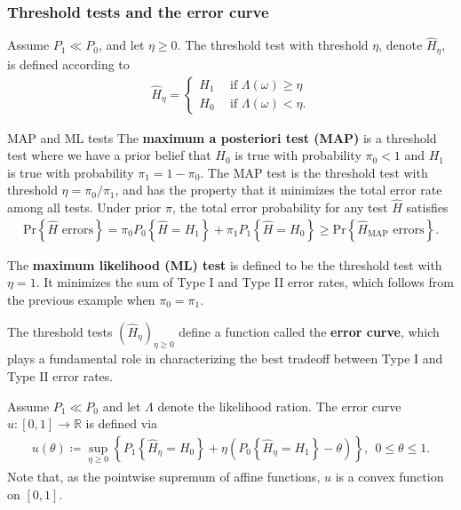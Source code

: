 
\subsubsection{Threshold tests and the error curve}

\begin{defn}{}{}
Assume \(P_1 \ll P_0\), and let \(\eta \geq 0 \). The threshold test with threshold \(\eta \), denote \(\hat{H} _\eta \), is defined according to 
\begin{align*}
    \hat{H} _\eta = \begin{cases}
        H_1 \ \ & \text{if } \Lambda (\omega ) \geq \eta \\
        H_0 \ \ & \text{if } \Lambda (\omega ) < \eta . 
    \end{cases}
\end{align*}

\end{defn}

\begin{exmp}{MAP and ML tests}{}
The \textbf{maximum a posteriori test (MAP)} is a threshold test where we have a prior belief that \(H_0\) is true with probability \(\pi _0 < 1\) and \(H_1\) is true with probability \(\pi _1 =1 - \pi _0\). The MAP test is the threshold test with threshold \(\eta = \pi _0 / \pi _1\), and has the property that it minimizes the total error rate among all tests. Under prior \(\pi\), the total error probability for any test \(\hat{H} \)  satisfies
\begin{align*}
    \mathrm{Pr} \left\{ \hat{H} \text{ errors}  \right\} = \pi _0 P_{0 } \left\{ \hat{H}  = H_1\right\} + \pi _1 P _1 \left\{ \hat{H} = H_0 \right\} \geq \mathrm{Pr} \left\{ \hat{H}_{\mathrm{MAP} } \text{ errors}  \right\}. 
\end{align*}

The \textbf{maximum likelihood (ML) test} is defined to be the threshold test with \(\eta  = 1\). It minimizes the sum of Type I and Type II error rates, which follows from the previous example when \(\pi _0 = \pi  _1\). 
\end{exmp}

\begin{defn}{}{}
The threshold tests \((\hat{H} _\eta )_{\eta \geq 0}\) define a function called the \textbf{error curve}, which plays a fundamental role in characterizing the best tradeoff between Type I and Type II error rates. 

Assume \(P_1 \ll P _0\) and let \(\Lambda \) denote the likelihood ration. The error curve \(u:[0,1] \to \mathbb{R} \) is defined via
\begin{align*}
    u(\theta )\coloneqq \sup _{\eta \geq 0} \left\{ P_{1} \left\{ \hat{H} _\eta = H_0 \right\} + \eta \left( P_0 \left\{ \hat{H} _\eta = H_1 \right\} - \theta   \right)    \right\}, \ \ 0 \leq \theta \leq 1. 
\end{align*}
Note that, as the pointwise supremum of affine functions, \(u\) is a convex function on \([0,1]\). 
\end{defn}

